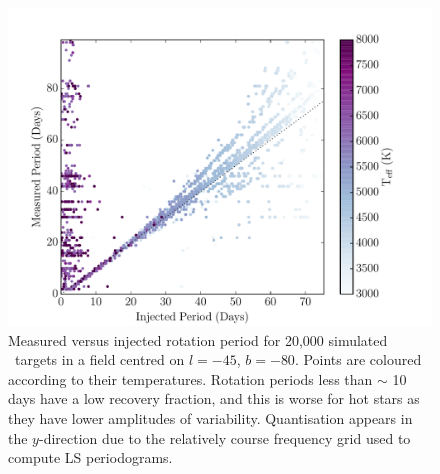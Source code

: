\begin{figure}
\begin{center}
\includegraphics[width=6in, clip=true]{figures/pvp_T_-80.pdf}
\caption[\LSST\ rotation period recovery results with temperature dependence]
{Measured versus injected rotation period for 20,000 simulated \LSST\ targets
in a field centred on $l=-45$, $b=-80$.
Points are coloured according to their temperatures.
Rotation periods less than $\sim$ 10 days have a low recovery fraction, and
this is worse for hot stars as they have lower amplitudes of variability.
Quantisation appears in the $y$-direction due to the relatively course
frequency grid used to compute LS periodograms.}
\label{fig:derek}
\end{center}
\end{figure}

